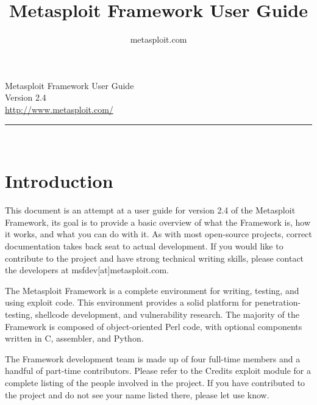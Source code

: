 \documentclass{report}
\begin{document}
\title{Metasploit Framework User Guide}
\author{metasploit.com}

\begin{titlepage}
    \begin{center}
        		

        \huge{Metasploit Framework User Guide}
		\ \\[10mm]
		\large{Version 2.4}
		\\[120mm]
		
        \small{\url{http://www.metasploit.com/}}

        \rule{10cm}{1pt} \\[4mm]
        \renewcommand{\arraystretch}{0.5}
    \end{center}
\end{titlepage}

\tableofcontents

\setlength{\parindent}{0pt} \setlength{\parskip}{8pt}



\chapter{Introduction}

\par
This document is an attempt at a user guide for version 2.4 of the Metasploit
Framework, its goal is to provide a basic overview of what the Framework is, how
it works, and what you can do with it. As with most open-source projects,
correct documentation takes back seat to actual development. If you would like
to contribute to the project and have strong technical writing skills, please
contact the developers at msfdev[at]metasploit.com.

\par
The Metasploit Framework is a complete environment for writing, testing, and
using exploit code. This environment provides a solid platform for
penetration-testing, shellcode development, and vulnerability research. The
majority of the Framework is composed of object-oriented Perl code, with
optional components written in C, assembler, and Python.  

\par
The Framework development team is made up of four full-time members and a handful
of part-time contributors. Please refer to the Credits exploit module for a complete
listing of the people involved in the project. If you have contributed to the project
and do not see your name listed there, please let use know.
\end{document}
